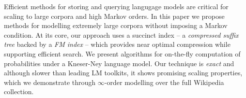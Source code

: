 Efficient methods for storing and querying langugage models are critical for scaling to large corpora and high Markov orders.
In this paper we propose methods for modelling extremely large corpora without
imposing a Markov condition.
At its core, our approach uses a succinct index -- a \emph{compressed suffix tree} backed by a \emph{FM index} -- which provides near optimal compression while supporting efficient search.
We present algorithms for on-the-fly computation of probabilities under a
Kneser-Ney language model.
Our technique is \emph{exact} and although slower than leading LM
toolkits, it shows promising scaling properties,
which we demonstrate through $\infty$-order modelling over the full Wikipedia collection. 


